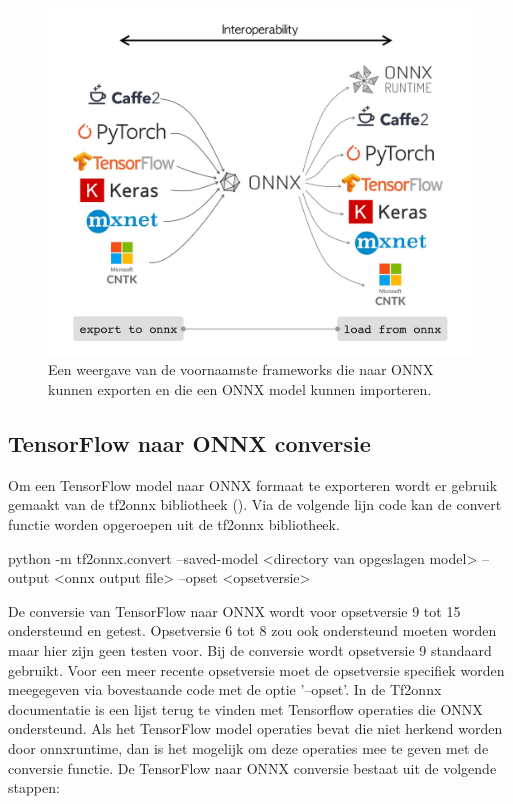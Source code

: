 \begin{figure}[!ht]
    \centering
 	\includegraphics[width=0.7\linewidth]{fig/onnx.jpeg}
 	\caption{Een weergave van de voornaamste frameworks die naar ONNX kunnen exporten en die een ONNX model kunnen importeren.}
 	\label{fig:onnx}
\end{figure}

\subsection{TensorFlow naar ONNX conversie}
Om een TensorFlow model naar ONNX formaat te exporteren wordt er gebruik gemaakt van de tf2onnx bibliotheek (\cite{onnx_tf2onnx_2021}).
Via de volgende lijn code kan de convert functie worden opgeroepen uit de tf2onnx bibliotheek.

\begin{python}
python -m tf2onnx.convert --saved-model <directory van opgeslagen model> 
		--output <onnx output file> --opset <opsetversie>
\end{python}


De conversie van TensorFlow naar ONNX wordt voor opsetversie 9 tot 15 ondersteund en getest.
Opsetversie 6 tot 8 zou ook ondersteund moeten worden maar hier zijn geen testen voor.
Bij de conversie wordt opsetversie 9 standaard gebruikt.
Voor een meer recente opsetversie moet de opsetversie specifiek worden meegegeven via bovestaande code met de optie '--opset'.
In de Tf2onnx documentatie is een lijst terug te vinden met Tensorflow operaties die ONNX ondersteund.
Als het TensorFlow model operaties bevat die niet herkend worden door onnxruntime, dan is het mogelijk om deze operaties mee te geven met de conversie functie.
De TensorFlow naar ONNX conversie bestaat uit de volgende stappen: 


